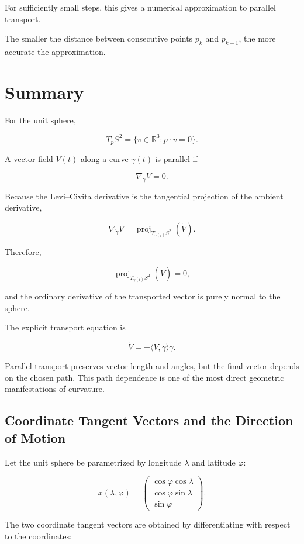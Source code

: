 \documentclass[12pt,a4paper]{article}
\theoremstyle{notespace}
\begin{document}
For sufficiently small steps, this gives a numerical approximation to
parallel transport.

The smaller the distance between consecutive points \(p_k\) and
\(p_{k+1}\), the more accurate the approximation.

\section{Summary}

For the unit sphere,

\[
T_pS^2
=
\{v\in\mathbb{R}^3:p\cdot v=0\}.
\]

A vector field \(V(t)\) along a curve \(\gamma(t)\) is parallel if

\[
\nabla_{\dot\gamma}V=0.
\]

Because the Levi--Civita derivative is the tangential projection of the
ambient derivative,

\[
\nabla_{\dot\gamma}V
=
\operatorname{proj}_{T_{\gamma(t)}S^2}(\dot V).
\]

Therefore,

\[
\operatorname{proj}_{T_{\gamma(t)}S^2}(\dot V)=0,
\]

and the ordinary derivative of the transported vector is purely normal
to the sphere.

The explicit transport equation is

\[
\boxed{
	\dot V
	=
	-\langle V,\dot\gamma\rangle\gamma.
}
\]

Parallel transport preserves vector length and angles, but the final
vector depends on the chosen path. This path dependence is one of the
most direct geometric manifestations of curvature.

\subsection{Coordinate Tangent Vectors and the Direction of Motion}

Let the unit sphere be parametrized by longitude \(\lambda\) and latitude
\(\varphi\):

\[
x(\lambda,\varphi)
=
\begin{pmatrix}
	\cos\varphi\cos\lambda\\
	\cos\varphi\sin\lambda\\
	\sin\varphi
\end{pmatrix}.
\]

The two coordinate tangent vectors are obtained by differentiating with
respect to the coordinates:
\end{document}
